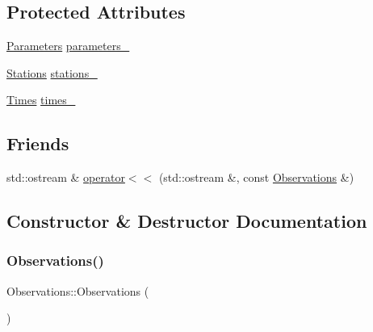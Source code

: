 \subsection*{Protected Attributes}
\begin{DoxyCompactItemize}
\item 
\mbox{\hyperlink{class_parameters}{Parameters}} \mbox{\hyperlink{class_observations_ad86a168276ed510e2e56ac9a1e632848}{parameters\+\_\+}}
\item 
\mbox{\hyperlink{class_stations}{Stations}} \mbox{\hyperlink{class_observations_ad047997c0d421695f07be2edeef996ce}{stations\+\_\+}}
\item 
\mbox{\hyperlink{class_times}{Times}} \mbox{\hyperlink{class_observations_ab68b4495a78a2a30396cd42206d3e33c}{times\+\_\+}}
\end{DoxyCompactItemize}
\subsection*{Friends}
\begin{DoxyCompactItemize}
\item 
std\+::ostream \& \mbox{\hyperlink{class_observations_ad93ae2b52ac4bae27e3419d1545ee68f}{operator$<$$<$}} (std\+::ostream \&, const \mbox{\hyperlink{class_observations}{Observations}} \&)
\end{DoxyCompactItemize}


\subsection{Constructor \& Destructor Documentation}
\mbox{\label{class_observations_ab5a998900064d3d0599e4548a6508d9f}} 
\subsubsection{\texorpdfstring{Observations()}{Observations()}\hspace{0.1cm}{\footnotesize\ttfamily [1/3]}}
{\footnotesize\ttfamily Observations\+::\+Observations (\begin{DoxyParamCaption}{ }\end{DoxyParamCaption})\hspace{0.3cm}{\ttfamily [delete]}}

\mbox{\label{class_observations_a579feccdac9c26226cf813ac8cf3521a}} 
